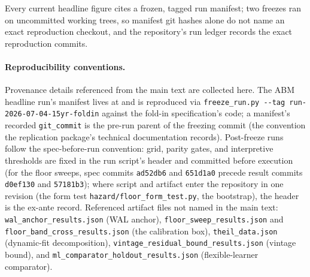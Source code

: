 \documentclass[12pt]{article}
\begin{document}
Every current headline figure cites a frozen, tagged run manifest; two freezes ran on uncommitted working trees, so manifest git hashes alone do not name an exact reproduction checkout, and the repository's run ledger records the exact reproduction commits.

\paragraph{Reproducibility conventions.} Provenance details referenced from the main text are collected here. The ABM headline run's manifest lives at  and is reproduced via \texttt{freeze\_run.py -{}-tag run-2026-07-04-15yr-foldin} against the fold-in specification's code; a manifest's recorded \texttt{git\_commit} is the pre-run parent of the freezing commit (the convention the replication package's technical documentation records). Post-freeze runs follow the spec-before-run convention: grid, parity gates, and interpretive thresholds are fixed in the run script's header and committed before execution (for the floor sweeps, spec commits \texttt{ad52db6} and \texttt{651d1a0} precede result commits \texttt{d0ef130} and \texttt{57181b3}); where script and artifact enter the repository in one revision (the form test \texttt{hazard/floor\_form\_test.py}, the bootstrap), the header is the ex-ante record. Referenced artifact files not named in the main text: \texttt{wal\_anchor\_results.json} (WAL anchor), \texttt{floor\_sweep\_results.json} and \texttt{floor\_band\_cross\_results.json} (the calibration box), \texttt{theil\_data.json} (dynamic-fit decomposition), \texttt{vintage\_residual\_bound\_results.json} (vintage bound), and \texttt{ml\_comparator\_holdout\_results.json} (flexible-learner comparator).
\end{document}

